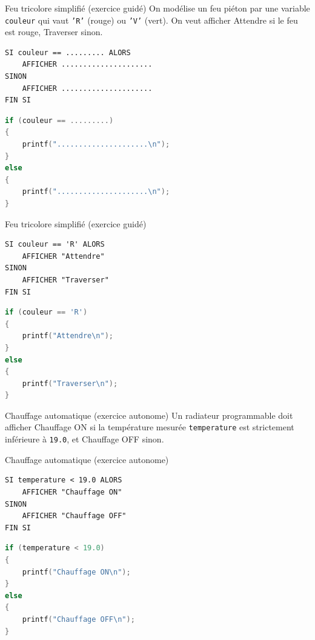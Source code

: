 \begin{UPSTIexercice}{Feu tricolore simplifié (exercice guidé)}
    On modélise un feu piéton par une variable \texttt{couleur} qui vaut \texttt{'R'} (rouge) ou \texttt{'V'} (vert). On veut afficher \og Attendre \fg{} si le feu est rouge, \og Traverser \fg{} sinon.

    \begin{verbatim}
SI couleur == ......... ALORS
    AFFICHER .....................
SINON
    AFFICHER .....................
FIN SI
    \end{verbatim}
    \begin{lstlisting}[language=C]
if (couleur == .........)
{
    printf(".....................\n");
}
else
{
    printf(".....................\n");
}
    \end{lstlisting}
\end{UPSTIexercice}

\begin{UPSTIprofOnlyEnv}
    \begin{UPSTIcorrectionP}{Feu tricolore simplifié (exercice guidé)}
        \begin{verbatim}
SI couleur == 'R' ALORS
    AFFICHER "Attendre"
SINON
    AFFICHER "Traverser"
FIN SI
        \end{verbatim}
        \begin{lstlisting}[language=C]
if (couleur == 'R')
{
    printf("Attendre\n");
}
else
{
    printf("Traverser\n");
}
        \end{lstlisting}
    \end{UPSTIcorrectionP}
\end{UPSTIprofOnlyEnv}


\begin{UPSTIexercice}{Chauffage automatique (exercice autonome)}
    Un radiateur programmable doit afficher \og Chauffage ON \fg{} si la température mesurée \texttt{temperature} est strictement inférieure à \texttt{19.0}, et \og Chauffage OFF \fg{} sinon.


\end{UPSTIexercice}

\begin{UPSTIprofOnlyEnv}
    \begin{UPSTIcorrectionP}{Chauffage automatique (exercice autonome)}
        \begin{verbatim}
SI temperature < 19.0 ALORS
    AFFICHER "Chauffage ON"
SINON
    AFFICHER "Chauffage OFF"
FIN SI
        \end{verbatim}
        \begin{lstlisting}[language=C]
if (temperature < 19.0)
{
    printf("Chauffage ON\n");
}
else
{
    printf("Chauffage OFF\n");
}
        \end{lstlisting}
    \end{UPSTIcorrectionP}
\end{UPSTIprofOnlyEnv}


